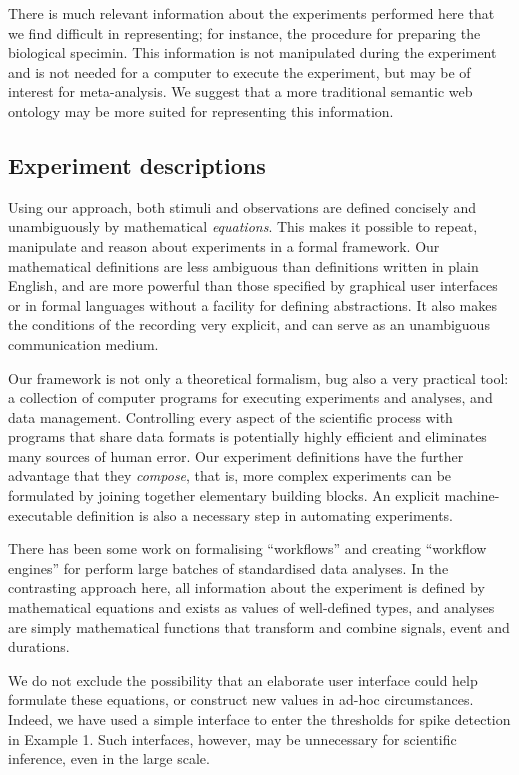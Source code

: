 There is much relevant information about the experiments performed
here that we find difficult in representing; for instance, the
procedure for preparing the biological specimin. This information is
not manipulated during the experiment and is not needed for a computer
to execute the experiment, but may be of interest for
meta-analysis. We suggest that a more traditional semantic web
ontology may be more suited for representing this information.

\subsection*{Experiment descriptions}

Using our approach, both stimuli and observations are defined
concisely and unambiguously by mathematical \emph{equations}. This
makes it possible to repeat, manipulate and reason about experiments
in a formal framework. Our mathematical definitions are less ambiguous
than definitions written in plain English, and are more powerful than
those specified by graphical user interfaces or in formal languages
without a facility for defining abstractions. It also makes the
conditions of the recording very explicit, and can serve as an
unambiguous communication medium.

Our framework is not only a theoretical formalism, bug also a very
practical tool: a collection of computer programs for executing
experiments and analyses, and data management. Controlling every
aspect of the scientific process with programs that share data formats
is potentially highly efficient and eliminates many sources of human
error. Our experiment definitions have the further advantage that they
\emph{compose}, that is, more complex experiments can be formulated by
joining together elementary building blocks. An explicit
machine-executable definition is also a necessary step in automating
experiments.

There has been some work on formalising ``workflows'' and creating
``workflow engines'' for perform large batches of standardised data
analyses. In the contrasting approach here, all information about the
experiment is defined by mathematical equations and exists as values
of well-defined types, and analyses are simply mathematical functions
that transform and combine signals, event and durations.

We do not exclude the possibility that an elaborate user interface
could help formulate these equations, or construct new values in
ad-hoc circumstances. Indeed, we have used a simple interface to enter
the thresholds for spike detection in Example 1. Such interfaces,
however, may be unnecessary for scientific inference, even in the
large scale.

